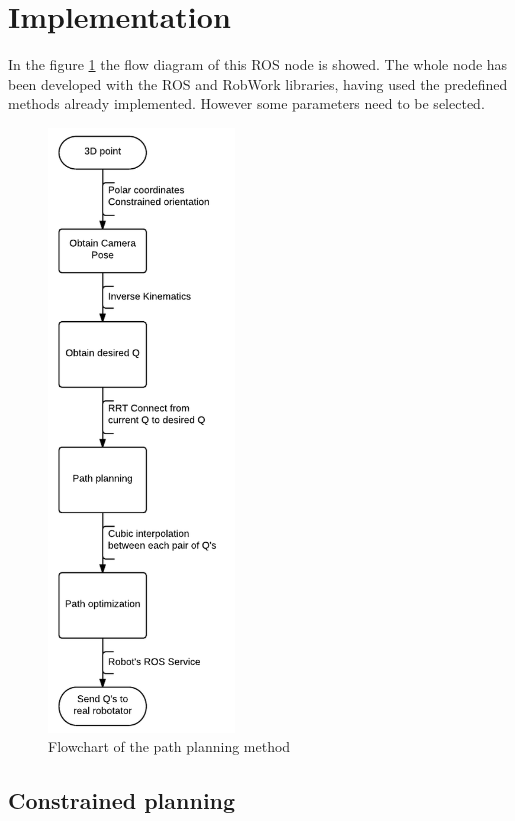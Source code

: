 \section{Implementation} %
\label{sec:implementation_pathplanning}
In the figure \ref{fig:path_planning_flowchart} the flow diagram of this ROS node is showed. The whole node has been developed with the ROS and RobWork libraries, having used the predefined methods already implemented. However some parameters need to be selected.
\begin{figure}[!hb]
	\centering
	\includegraphics[height=16cm]{figures/path_planning_flowchart}
	\caption{Flowchart of the path planning method}
	\label{fig:path_planning_flowchart}
\end{figure}

	\subsection{Constrained planning} %
	\label{sub:contrained_planning_implementation}
